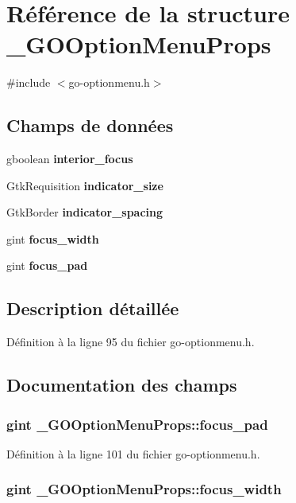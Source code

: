 \section{Référence de la structure \_\-GOOptionMenuProps}
\label{struct__GOOptionMenuProps}


{\ttfamily \#include $<$go-\/optionmenu.h$>$}

\subsection*{Champs de données}
\begin{DoxyCompactItemize}
\item 
gboolean {\bf interior\_\-focus}
\item 
GtkRequisition {\bf indicator\_\-size}
\item 
GtkBorder {\bf indicator\_\-spacing}
\item 
gint {\bf focus\_\-width}
\item 
gint {\bf focus\_\-pad}
\end{DoxyCompactItemize}


\subsection{Description détaillée}


Définition à la ligne 95 du fichier go-\/optionmenu.h.



\subsection{Documentation des champs}
\subsubsection[{focus\_\-pad}]{\setlength{\rightskip}{0pt plus 5cm}gint {\bf \_\-GOOptionMenuProps::focus\_\-pad}}\label{struct__GOOptionMenuProps_ac4ce5f102222b86f7e33991daf5664d4}


Définition à la ligne 101 du fichier go-\/optionmenu.h.

\subsubsection[{focus\_\-width}]{\setlength{\rightskip}{0pt plus 5cm}gint {\bf \_\-GOOptionMenuProps::focus\_\-width}}\label{struct__GOOptionMenuProps_ab959d93388f95d6d852e21d0f9efe160}



